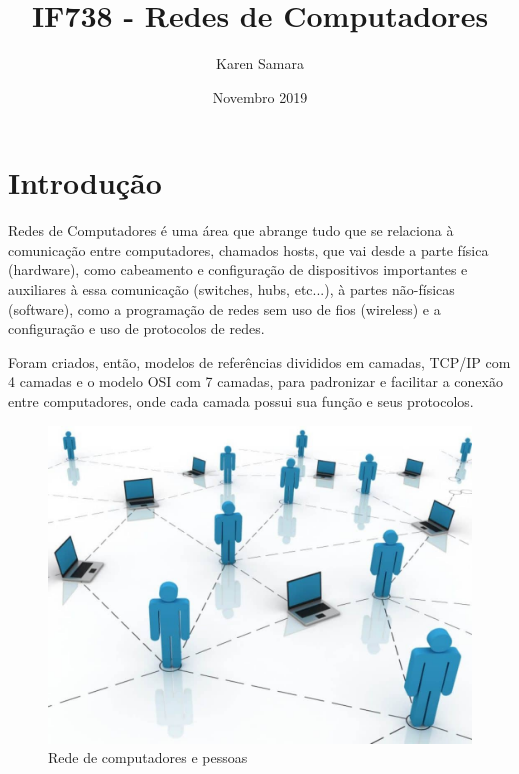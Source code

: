 \documentclass[a4paper,10pt]{article}
\title{IF738 - Redes de Computadores}
\author{Karen Samara}
\date{Novembro 2019}
\begin{document}
\maketitle

\section{Introdução} 
    Redes de Computadores é uma área que abrange tudo que se relaciona à comunicação entre computadores, chamados hosts, que vai desde a parte física (hardware), como cabeamento e configuração de dispositivos importantes e auxiliares à essa comunicação (switches, hubs, etc...), à partes não-físicas (software), como a programação de redes sem uso de fios (wireless) e a configuração e uso de protocolos de redes. 
    \par
    Foram criados, então, modelos de referências divididos em camadas, TCP/IP \cite{link3} com 4 camadas e o modelo OSI \cite{link2} com 7 camadas, para padronizar e facilitar a conexão entre computadores, onde cada camada possui sua função e seus protocolos.

\begin{figure}[h!]
\centering
\includegraphics[scale=0.1]{computer-network.jpg}
\caption{Rede de computadores e pessoas \cite{imagem1}}
\label{fig:computer-network}
\end{figure}
\end{document}
